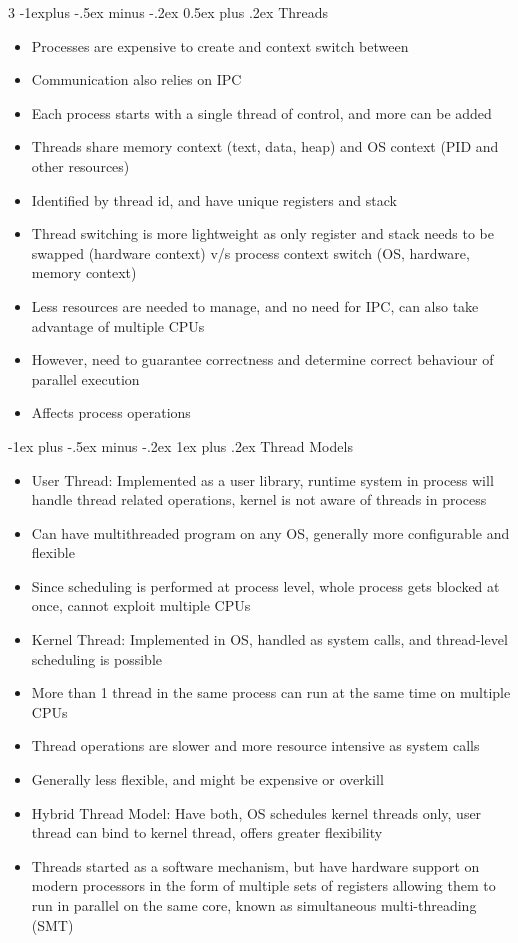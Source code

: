 \documentclass[10pt, landscape]{article}
\makeatletter
\renewcommand{\section}{\@startsection{section}{1}{0mm}%
                                {-1ex plus -.5ex minus -.2ex}%
                                {0.5ex plus .2ex}%
                                {\normalfont\large\bfseries}}
\renewcommand{\section}{\@startsection{section}{2}{0mm}%
                                {-1explus -.5ex minus -.2ex}%
                                {0.5ex plus .2ex}%
                                {\normalfont\normalsize\bfseries}}
\renewcommand{\subsection}{\@startsection{subsection}{3}{0mm}%
                                {-1ex plus -.5ex minus -.2ex}%
                                {1ex plus .2ex}%
                                {\normalfont\small\bfseries}}%
\makeatother
\begin{document}
\begin{multicols*}{3}
\section{Threads}
\begin{itemize}
    \item Processes are expensive to create and context switch between
    \item Communication also relies on IPC
    \item Each process starts with a single thread of control, and more can be added
    \item Threads share memory context (text, data, heap) and OS context (PID and other resources)
    \item Identified by thread id, and have unique registers and stack
    \item Thread switching is more lightweight as only register and stack needs to be swapped (hardware context) v/s process context switch (OS, hardware, memory context)
    \item Less resources are needed to manage, and no need for IPC, can also take advantage of multiple CPUs
    \item However, need to guarantee correctness and determine correct behaviour of parallel execution
    \item Affects process operations
\end{itemize}

\subsection{Thread Models}
\begin{itemize}
    \item User Thread: Implemented as a user library, runtime system in process will handle thread related operations, kernel is not aware of threads in process
    \item Can have multithreaded program on any OS, generally more configurable and flexible
    \item Since scheduling is performed at process level, whole process gets blocked at once, cannot exploit multiple CPUs
    \item Kernel Thread: Implemented in OS, handled as system calls, and thread-level scheduling is possible
    \item More than 1 thread in the same process can run at the same time on multiple CPUs
    \item Thread operations are slower and more resource intensive as system calls
    \item Generally less flexible, and might be expensive or overkill
    \item Hybrid Thread Model: Have both, OS schedules kernel threads only, user thread can bind to kernel thread, offers greater flexibility
    \item Threads started as a software mechanism, but have hardware support on modern processors in the form of multiple sets of registers allowing them to run in parallel on the same core, known as simultaneous multi-threading (SMT)
\end{itemize}


\end{multicols*}
\end{document}
